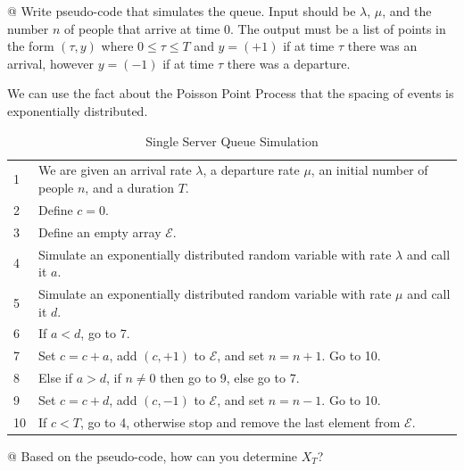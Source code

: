 \documentclass[10pt]{article}
\begin{document}
\begin{easylist}[enumerate]
    \vspace{0.5cm}
    @ Write pseudo-code that simulates the queue. Input should be $\lambda$,
    $\mu$, and the number $n$ of people that arrive at time $0$. The output must
    be a list of points in the form $(\tau, y)$ where $0 \le \tau \le T$ and $y
    = (+1)$ if at time $\tau$ there was an arrival, however $y=(-1)$ if at time
    $\tau$ there was a departure.
    \vspace{0.5cm}

    We can use the fact about the Poisson Point Process that the spacing of
    events is exponentially distributed.

    \begin{table}[H]
        \centering
        \begin{tabular}{|l|p{}|}
            \hline
            1 & We are given an arrival rate $\lambda$, a departure rate $\mu$,
            an initial number of people $n$, and a duration $T$.\\
            2 & Define $c=0$.\\
            3 & Define an empty array $\mathcal{E}$.\\
            4 & Simulate an exponentially distributed random variable with rate
            $\lambda$ and call it $a$.\\
            5 & Simulate an exponentially distributed random variable with rate
            $\mu$ and call it $d$.\\
            6 & If $a < d$, go to 7.\\
            7 & Set $c = c + a$, add $(c, +1)$ to $\mathcal{E}$, and set $n = n
            + 1$. Go to 10.\\
            8 & Else if $a > d$, if $n \neq 0$ then go to 9, else go to 7.\\
            9 & Set $c = c + d$, add $(c, -1)$ to $\mathcal{E}$, and set $n = n
            - 1$. Go to 10.\\
            10 & If $c < T$, go to 4, otherwise stop and remove the last element
            from $\mathcal{E}$.\\
            \hline
        \end{tabular}
        \caption{Single Server Queue Simulation}
    \end{table}

    \vspace{0.5cm}
    @ Based on the pseudo-code, how can you determine $X_T$?
    \vspace{0.5cm}


\end{easylist}
\end{document}
